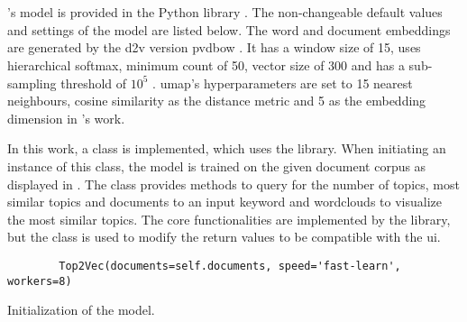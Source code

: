 \section{\topTwovec{}}\label{sec:impl-top2vec}

\citeauthor{Top2Vec2020}'s \topTwovec{} model is provided in the Python library \topTwovec{} \cite{Top2Vec2020}.
The non-changeable default values and settings of the model are listed below.
The word and document embeddings are generated by the \ac{d2v} version \ac{pvdbow} \cite{Top2Vec2020}.
It has a window size of 15, uses hierarchical softmax, minimum count of 50, vector size of 300 and has a sub-sampling threshold of $10^5$ \cite{Top2Vec2020}.
\ac{umap}'s hyperparameters are set to 15 nearest neighbours, cosine similarity as the distance metric and 5 as the embedding dimension in \citeauthor{Top2Vec2020}'s work.

In this work, a class is implemented, which uses the \topTwovec{} library.
When initiating an instance of this class, the \topTwovec{} model is trained on the given document corpus as displayed in .
The class provides methods to query for the number of topics, 
most similar topics and documents to an input keyword and wordclouds to visualize the most similar topics.
The core functionalities are implemented by the \topTwovec{} library, but the class is used to modify the return values to be compatible with the \ac{ui}.


\begin{listing}[htp]
    \begin{verbatim}
        Top2Vec(documents=self.documents, speed='fast-learn', workers=8)
    \end{verbatim}
    \caption{Initialization of the \topTwovec{} model.
    }
    \label{lst:init-top2vec}
\end{listing}